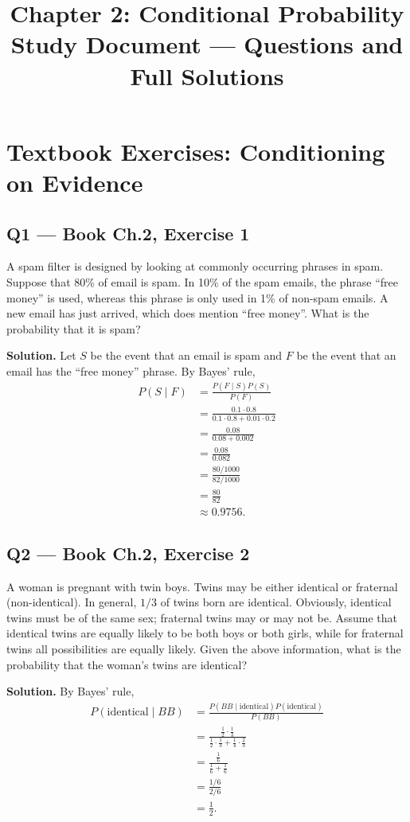 \documentclass[11pt]{article}
\title{\textbf{Chapter 2: Conditional Probability}\\[4pt]\large Study Document --- Questions and Full Solutions}
\author{}
\date{}
\begin{document}
\maketitle
\tableofcontents
\newpage

\section{Textbook Exercises: Conditioning on Evidence}

\subsection*{Q1 --- Book Ch.2, Exercise 1}
\begin{qbox}
A spam filter is designed by looking at commonly occurring phrases in spam. Suppose that 80\% of email is spam. In 10\% of the spam emails, the phrase ``free money'' is used, whereas this phrase is only used in 1\% of non-spam emails. A new email has just arrived, which does mention ``free money''. What is the probability that it is spam?
\end{qbox}
\textbf{Solution.} Let $S$ be the event that an email is spam and $F$ be the event that an email has the ``free money'' phrase. By Bayes' rule,
\begin{align*}
P(S \mid F) &= \frac{P(F\mid S)P(S)}{P(F)} \\
&= \frac{0.1 \cdot 0.8}{0.1\cdot 0.8 + 0.01 \cdot 0.2} \\
&= \frac{0.08}{0.08 + 0.002} \\
&= \frac{0.08}{0.082} \\
&= \frac{80/1000}{82/1000} \\
&= \frac{80}{82} \\
&\approx 0.9756.
\end{align*}

\subsection*{Q2 --- Book Ch.2, Exercise 2}
\begin{qbox}
A woman is pregnant with twin boys. Twins may be either identical or fraternal (non-identical). In general, $1/3$ of twins born are identical. Obviously, identical twins must be of the same sex; fraternal twins may or may not be. Assume that identical twins are equally likely to be both boys or both girls, while for fraternal twins all possibilities are equally likely. Given the above information, what is the probability that the woman's twins are identical?
\end{qbox}
\textbf{Solution.} By Bayes' rule,
\begin{align*}
P(\text{identical} \mid BB) &= \frac{P(BB\mid \text{identical})P(\text{identical})}{P(BB)} \\
&= \frac{\tfrac{1}{2}\cdot \tfrac{1}{3}}{\tfrac{1}{2}\cdot\tfrac{1}{3} + \tfrac{1}{4}\cdot\tfrac{2}{3}} \\
&= \frac{\tfrac{1}{6}}{\tfrac{1}{6} + \tfrac{1}{6}} \\
&= \frac{1/6}{2/6} \\
&= \frac{1}{2}.
\end{align*}
\end{document}
